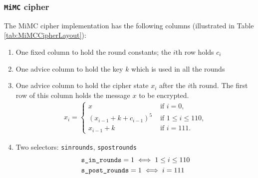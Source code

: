 \documentclass[10pt]{article}
\begin{document}
\subsubsection{\texttt{MiMC} cipher}
The MiMC cipher implementation has the following columns (illustrated in Table \ref{tab:MiMCCipherLayout}):
\begin{enumerate}
  \item One fixed column to hold the round constants; the $i$th row holds $c_i$
  \item One advice column to hold the key $k$ which is used in all the rounds
  \item One advice column to hold the cipher state $x_i$ after the $i$th round. The first row of this column holds the message $x$ to be encrypted.
    \begin{align*}
      x_i = 
      \begin{cases}
        x & \text{ if } i = 0,\\
        (x_{i-1} + k + c_{i-1})^5 & \text{ if } 1 \le i \le  110,\\
        x_{i-1} + k & \text{ if } i=111.
      \end{cases}
    \end{align*}
  \item Two selectors: \texttt{s\textunderscore in\textunderscore rounds}, \texttt{s\textunderscore post\textunderscore rounds}
    \begin{align*}
      & \texttt{s\textunderscore in\textunderscore rounds} = 1  \iff 1 \le i\le 110\\
      & \texttt{s\textunderscore post\textunderscore rounds} = 1  \iff i=111
    \end{align*}
\end{enumerate}

\begin{table}[t]
  \centering
  \caption{\texttt{MiMC} cipher layout}
  \label{tab:MiMCCipherLayout}
\end{table}
\end{document}
